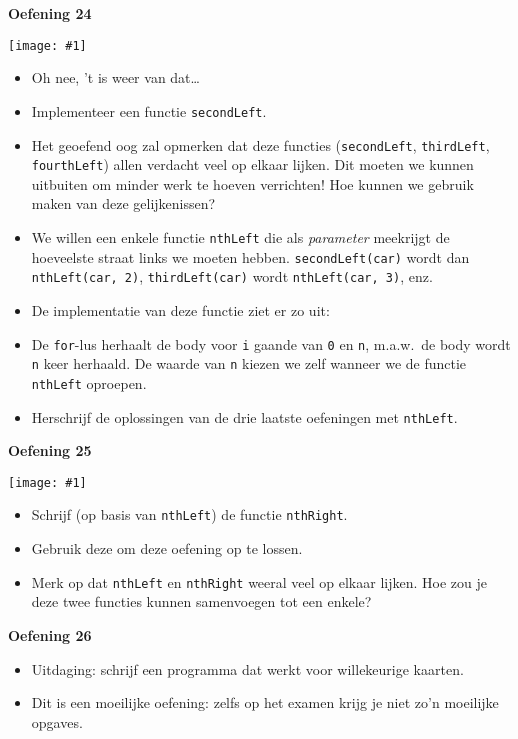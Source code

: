 \documentclass[a4paper]{article}
\newcommand{\newexercise}[1]{\clearpage\begin{center}\Huge\bf #1\end{center}}
\newcommand{\exercisemap}[1]{\begin{center}\texttt{[image: \#1]}\end{center}}
\newcommand{\code}[1]{
  \begin{center}
    \begin{minipage}{.8\linewidth}
      
    \end{minipage}
  \end{center}
}
\begin{document}
\newexercise{Oefening 24}
\exercisemap{ex24}
\begin{itemize}
  \item Oh nee, 't is weer van dat\dots
  \item Implementeer een functie \verb'secondLeft'.
  \item Het geoefend oog zal opmerken dat deze functies (\verb'secondLeft', \verb'thirdLeft', \verb'fourthLeft')
        allen verdacht veel op elkaar lijken. Dit moeten we kunnen uitbuiten om minder werk te hoeven verrichten!
        Hoe kunnen we gebruik maken van deze gelijkenissen?
  \item We willen een enkele functie \verb'nthLeft' die als \emph{parameter} meekrijgt
        de hoeveelste straat links we moeten hebben. \verb'secondLeft(car)' wordt
        dan \verb'nthLeft(car, 2)', \verb'thirdLeft(car)' wordt \verb'nthLeft(car, 3)', enz.
  \item De implementatie van deze functie ziet er zo uit:
        \code{nthleft.js}
  \item De \verb'for'-lus herhaalt de body voor \verb'i' gaande van \verb'0' en \verb'n', m.a.w.\
        de body wordt \verb'n' keer herhaald. De waarde van \verb'n' kiezen we zelf wanneer
        we de functie \verb'nthLeft' oproepen.
  \item Herschrijf de oplossingen van de drie laatste oefeningen met \verb'nthLeft'.
\end{itemize}


\newexercise{Oefening 25}
\exercisemap{ex25}
\begin{itemize}
  \item Schrijf (op basis van \verb'nthLeft') de functie \verb'nthRight'.
  \item Gebruik deze om deze oefening op te lossen.
  \item Merk op dat \verb'nthLeft' en \verb'nthRight' weeral veel op elkaar lijken.
        Hoe zou je deze twee functies kunnen samenvoegen tot een enkele?
\end{itemize}


\newexercise{Oefening 26}
\begin{itemize}
  \item Uitdaging: schrijf een programma dat werkt voor willekeurige kaarten.
  \item Dit is een moeilijke oefening: zelfs op het examen krijg je niet zo'n moeilijke opgaves.
\end{itemize}
\end{document}

